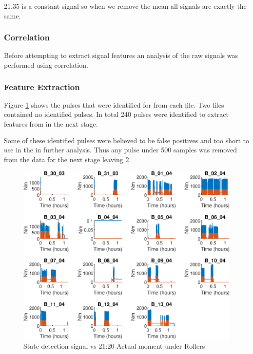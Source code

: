\documentclass{article}
\begin{document}
21.35 is a constant signal so when we remove the mean all signals are exactly the same.

\subsubsection{Correlation}
Before attempting to extract signal features an analysis of the raw signals was performed using correlation.\\
    
\subsubsection{Feature Extraction}
Figure \ref{fig:StateDetection} shows the pulses that were identified for from each file. Two files contained no identified pulses. In total 240 pulses were identified to extract features from in the next stage.

Some of these identified pulses were believed to be false positives and too short to use in the in further analysis. Thus any pulse under 500 samples was removed from the data for the next stage leaving 2

\begin{figure}[!ht]
    \centering
    \includegraphics[width=\textwidth, height=\textheight, keepaspectratio]{figures/StateDetectionFig.eps}
    \caption{State detection signal vs 21:20 Actual moment under Rollers}
    \label{fig:StateDetection}
\end{figure}
\end{document}
